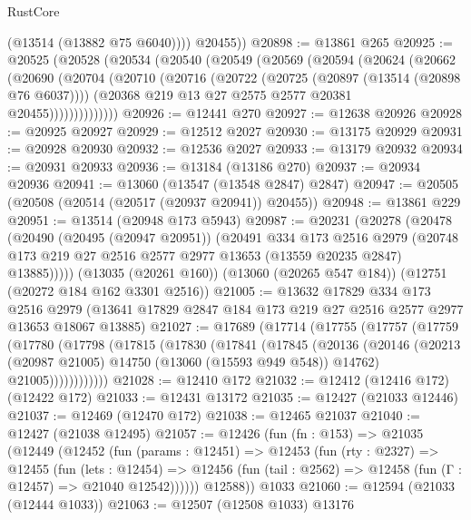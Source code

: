 \begin{lexlean}{RustCore}
\begin{coremodule}
            (@13514 (@13882 @75 @6040))))
        @20455))
@20898 := @13861 @265
@20925 := @20525
    (@20528
      (@20534
        (@20540
          (@20549
            (@20569
              (@20594
                (@20624
                  (@20662
                    (@20690
                      (@20704
                        (@20710
                          (@20716
                            (@20722
                              (@20725 (@20897 (@13514 (@20898 @76 @6037))))
                              (@20368 @219 @13 @27 @2575 @2577 @20381 @20455))))))))))))))
@20926 := @12441 @270
@20927 := @12638 @20926
@20928 := @20925 @20927
@20929 := @12512 @2027
@20930 := @13175 @20929
@20931 := @20928 @20930
@20932 := @12536 @2027
@20933 := @13179 @20932
@20934 := @20931 @20933
@20936 := @13184 (@13186 @270)
@20937 := @20934 @20936
@20941 := @13060 (@13547 (@13548 @2847) @2847)
@20947 := @20505 (@20508 (@20514 (@20517 (@20937 @20941)) @20455))
@20948 := @13861 @229
@20951 := @13514 (@20948 @173 @5943)
@20987 := @20231
    (@20278
      (@20478
        (@20490
          (@20495 (@20947 @20951))
          (@20491
            @334
            @173
            @2516
            @2979
            (@20748 @173 @219 @27 @2516 @2577 @2977 @13653 (@13559 @20235 @2847) @13885)))))
    (@13035 (@20261 @160))
    (@13060 (@20265 @547 @184))
    (@12751 (@20272 @184 @162 @3301 @2516))
@21005 := @13632
    @17829
    @334
    @173
    @2516
    @2979
    (@13641 @17829 @2847 @184 @173 @219 @27 @2516 @2577 @2977 @13653 @18067 @13885)
@21027 := @17689
    (@17714
      (@17755
        (@17757
          (@17759
            (@17780
              (@17798
                (@17815
                  (@17830
                    (@17841
                      (@17845
                        (@20136
                          (@20146
                            (@20213 (@20987 @21005) @14750 (@13060 (@15593 @949 @548)) @14762)
                            @21005))))))))))))
@21028 := @12410 @172
@21032 := @12412 (@12416 @172) (@12422 @172)
@21033 := @12431 @13172
@21035 := @12427 (@21033 @12446)
@21037 := @12469 (@12470 @172)
@21038 := @12465 @21037
@21040 := @12427 (@21038 @12495)
@21057 := @12426
    (fun (fn : @153) =>
    @21035
      (@12449
        (@12452
          (fun (params : @12451) =>
          @12453
            (fun (rty : @2327) =>
            @12455
              (fun (lets : @12454) =>
              @12456 (fun (tail : @2562) => @12458 (fun (Γ : @12457) => @21040 @12542))))))
        @12588))
    @1033
@21060 := @12594 (@21033 (@12444 @1033))
@21063 := @12507 (@12508 @1033) @13176

\end{coremodule}
\end{lexlean}
